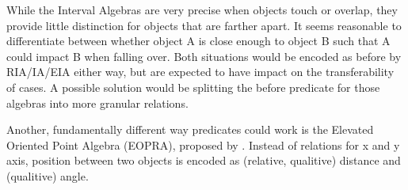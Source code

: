 While the Interval Algebras are very precise when objects touch or overlap, they provide little distinction for objects that are farther apart. It seems reasonable to differentiate between whether object A is close enough to object B such that A could impact B when falling over. Both situations would be encoded as before by RIA/IA/EIA either way, but are expected to have impact on the transferability of cases.
A possible solution would be splitting the before predicate for those algebras into more granular relations.

Another, fundamentally different way predicates could work is the Elevated Oriented Point Algebra (EOPRA), proposed by \cite{EOPRA-Perico2016CollaborativeCO}. Instead of relations for x and y axis, position between two objects is encoded as (relative, qualitive) distance and (qualitive) angle.
